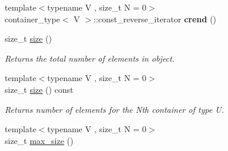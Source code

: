 \begin{DoxyCompactItemize}
\item 
\hypertarget{classheterogeneous_1_1heterovector_3_01_t_00_01_u_00_01_types_8_8_8_4_a7f4dbee095e34286f4072036830e0c19}{}{\footnotesize template$<$typename V , size\+\_\+t N = 0$>$ }\\container\+\_\+type$<$ V $>$\+::const\+\_\+reverse\+\_\+iterator {\bfseries crend} ()\label{classheterogeneous_1_1heterovector_3_01_t_00_01_u_00_01_types_8_8_8_4_a7f4dbee095e34286f4072036830e0c19}

\item 
\hypertarget{classheterogeneous_1_1heterovector_3_01_t_00_01_u_00_01_types_8_8_8_4_a1b170da792dfb562a4346a16cb9f7cce}{}size\+\_\+t \hyperlink{classheterogeneous_1_1heterovector_3_01_t_00_01_u_00_01_types_8_8_8_4_a1b170da792dfb562a4346a16cb9f7cce}{size} ()\label{classheterogeneous_1_1heterovector_3_01_t_00_01_u_00_01_types_8_8_8_4_a1b170da792dfb562a4346a16cb9f7cce}

\begin{DoxyCompactList}\small\item\em Returns the total number of elements in object. \end{DoxyCompactList}\item 
\hypertarget{classheterogeneous_1_1heterovector_3_01_t_00_01_u_00_01_types_8_8_8_4_a1d5fc0668d0366a9a6f05584a35a8a23}{}{\footnotesize template$<$typename V , size\+\_\+t N = 0$>$ }\\size\+\_\+t \hyperlink{classheterogeneous_1_1heterovector_3_01_t_00_01_u_00_01_types_8_8_8_4_a1d5fc0668d0366a9a6f05584a35a8a23}{size} () const \label{classheterogeneous_1_1heterovector_3_01_t_00_01_u_00_01_types_8_8_8_4_a1d5fc0668d0366a9a6f05584a35a8a23}

\begin{DoxyCompactList}\small\item\em Returns number of elements for the Nth container of type U. \end{DoxyCompactList}\item 
\hypertarget{classheterogeneous_1_1heterovector_3_01_t_00_01_u_00_01_types_8_8_8_4_a09224577bf36a2c99d771baf503b01e5}{}{\footnotesize template$<$typename V , size\+\_\+t N = 0$>$ }\\size\+\_\+t \hyperlink{classheterogeneous_1_1heterovector_3_01_t_00_01_u_00_01_types_8_8_8_4_a09224577bf36a2c99d771baf503b01e5}{max\+\_\+size} ()\label{classheterogeneous_1_1heterovector_3_01_t_00_01_u_00_01_types_8_8_8_4_a09224577bf36a2c99d771baf503b01e5}


\end{DoxyCompactItemize}
